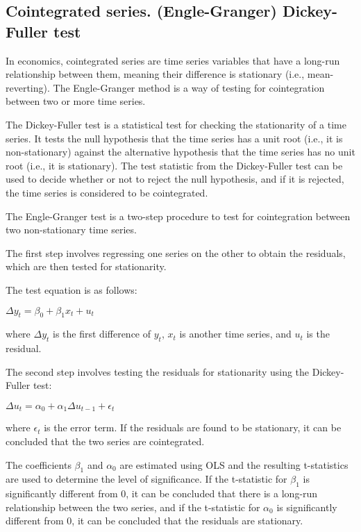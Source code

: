 \documentclass[12pt, a4paper, oneside]{article}
\begin{document}
\subsection{ Cointegrated series. (Engle-Granger) Dickey-Fuller test }
In economics, cointegrated series are time series variables that have a long-run relationship between them, meaning their difference is stationary (i.e., mean-reverting). The Engle-Granger method is a way of testing for cointegration between two or more time series.

The Dickey-Fuller test is a statistical test for checking the stationarity of a time series. It tests the null hypothesis that the time series has a unit root (i.e., it is non-stationary) against the alternative hypothesis that the time series has no unit root (i.e., it is stationary). The test statistic from the Dickey-Fuller test can be used to decide whether or not to reject the null hypothesis, and if it is rejected, the time series is considered to be cointegrated.

The Engle-Granger test is a two-step procedure to test for cointegration between two non-stationary time series.

The first step involves regressing one series on the other to obtain the residuals, which are then tested for stationarity.

The test equation is as follows:

$\Delta y_t = \beta_0 + \beta_1 x_t + u_t$

where $\Delta y_t$ is the first difference of $y_t$, $x_t$ is another time series, and $u_t$ is the residual.

The second step involves testing the residuals for stationarity using the Dickey-Fuller test:

$\Delta u_t = \alpha_0 + \alpha_1 \Delta u_{t-1} + \epsilon_t$

where $\epsilon_t$ is the error term. If the residuals are found to be stationary, it can be concluded that the two series are cointegrated.

The coefficients $\beta_1$ and $\alpha_0$ are estimated using OLS and the resulting t-statistics are used to determine the level of significance. If the t-statistic for $\beta_1$ is significantly different from 0, it can be concluded that there is a long-run relationship between the two series, and if the t-statistic for $\alpha_0$ is significantly different from 0, it can be concluded that the residuals are stationary.
\end{document}

